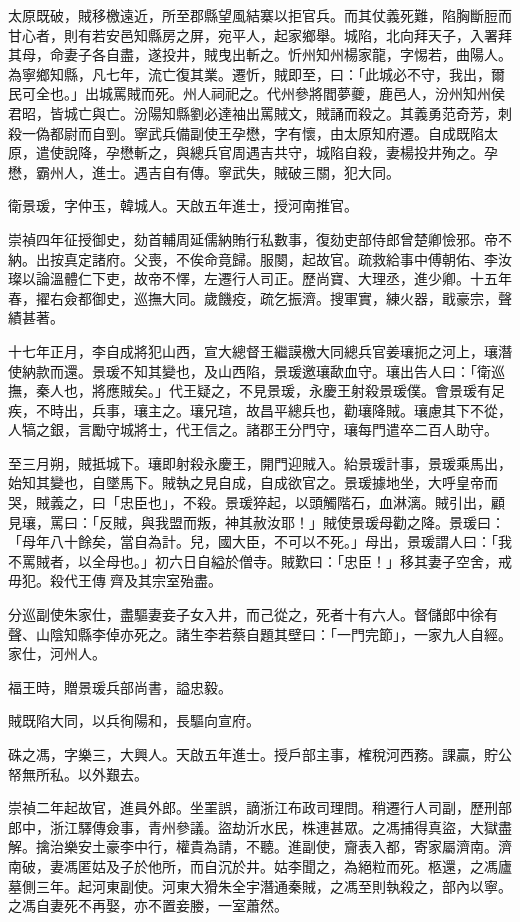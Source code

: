 \begin{pinyinscope}
{{太原既破，賊移檄遠近，所至郡縣望風結寨以拒官兵。而其仗義死難，陷胸斷脰而甘心者，則有若安邑知縣房之屏，宛平人，起家鄉舉。城陷，北向拜天子，入署拜其母，命妻子各自盡，遂投井，賊曳出斬之。忻州知州楊家龍，字惕若，曲陽人。為寧鄉知縣，凡七年，流亡復其業。遷忻，賊即至，曰：「此城必不守，我出，爾民可全也。」出城罵賊而死。州人祠祀之。代州參將閻夢夔，鹿邑人，汾州知州侯君昭，皆城亡與亡。汾陽知縣劉必達袖出罵賊文，賊誦而殺之。其義勇范奇芳，刺殺一偽都尉而自剄。寧武兵備副使王孕懋，字有懷，由太原知府遷。自成既陷太原，遣使說降，孕懋斬之，與總兵官周遇吉共守，城陷自殺，妻楊投井殉之。孕懋，霸州人，進士。遇吉自有傳。寧武失，賊破三關，犯大同。

衛景瑗，字仲玉，韓城人。天啟五年進士，授河南推官。

崇禎四年征授御史，劾首輔周延儒納賄行私數事，復劾吏部侍郎曾楚卿憸邪。帝不納。出按真定諸府。父喪，不俟命竟歸。服闋，起故官。疏救給事中傅朝佑、李汝璨以論溫體仁下吏，故帝不懌，左遷行人司正。歷尚寶、大理丞，進少卿。十五年春，擢右僉都御史，巡撫大同。歲饑疫，疏乞振濟。搜軍實，練火器，戢豪宗，聲績甚著。

十七年正月，李自成將犯山西，宣大總督王繼謨檄大同總兵官姜瓖扼之河上，瓖潛使納款而還。景瑗不知其變也，及山西陷，景瑗邀瓖歃血守。瓖出告人曰：「衛巡撫，秦人也，將應賊矣。」代王疑之，不見景瑗，永慶王射殺景瑗僕。會景瑗有足疾，不時出，兵事，瓖主之。瓖兄瑄，故昌平總兵也，勸瓖降賊。瓖慮其下不從，人犒之銀，言勵守城將士，代王信之。諸郡王分門守，瓖每門遣卒二百人助守。

至三月朔，賊抵城下。瓖即射殺永慶王，開門迎賊入。紿景瑗計事，景瑗乘馬出，始知其變也，自墜馬下。賊執之見自成，自成欲官之。景瑗據地坐，大呼皇帝而哭，賊義之，曰「忠臣也」，不殺。景瑗猝起，以頭觸階石，血淋漓。賊引出，顧見瓖，罵曰：「反賊，與我盟而叛，神其赦汝耶！」賊使景瑗母勸之降。景瑗曰：「母年八十餘矣，當自為計。兒，國大臣，不可以不死。」母出，景瑗謂人曰：「我不罵賊者，以全母也。」初六日自縊於僧寺。賊歎曰：「忠臣！」移其妻子空舍，戒毋犯。殺代王傳齊及其宗室殆盡。

分巡副使朱家仕，盡驅妻妾子女入井，而己從之，死者十有六人。督儲郎中徐有聲、山陰知縣李倬亦死之。諸生李若蔡自題其壁曰：「一門完節」，一家九人自經。家仕，河州人。

福王時，贈景瑗兵部尚書，謚忠毅。

賊既陷大同，以兵徇陽和，長驅向宣府。

硃之馮，字樂三，大興人。天啟五年進士。授戶部主事，榷稅河西務。課贏，貯公帑無所私。以外艱去。

崇禎二年起故官，進員外郎。坐罣誤，謫浙江布政司理問。稍遷行人司副，歷刑部郎中，浙江驛傳僉事，青州參議。盜劫沂水民，株連甚眾。之馮捕得真盜，大獄盡解。擒治樂安土豪李中行，權貴為請，不聽。進副使，齎表入都，寄家屬濟南。濟南破，妻馮匿姑及子於他所，而自沉於井。姑李聞之，為絕粒而死。柩還，之馮廬墓側三年。起河東副使。河東大猾朱全宇潛通秦賊，之馮至則執殺之，部內以寧。之馮自妻死不再娶，亦不置妾媵，一室蕭然。

}}
\end{pinyinscope}
